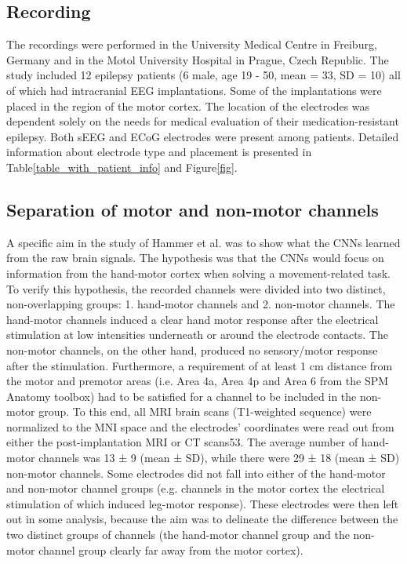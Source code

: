 \subsection{Recording}\label{subsec:recording}
The recordings were performed in the University Medical Centre in Freiburg, Germany and in the Motol University Hospital in Prague, Czech Republic.
The study included 12 epilepsy patients (6 male, age 19 - 50, mean = 33, SD = 10) all of which had intracranial EEG implantations.
Some of the implantations were placed in the region of the motor cortex.
The location of the electrodes was dependent solely on the needs for medical evaluation of their medication-resistant epilepsy.
Both sEEG and ECoG electrodes were present among patients.
Detailed information about electrode type and placement is presented in Table\ref{table_with_patient_info} and Figure\ref{fig}.

\subsection{Separation of motor and non-motor channels}\label{subsec:separation-of-motor-and-non-motor-channels}
A specific aim in the study of Hammer et al.\cite{Hammer-2021} was to show what the CNNs learned from the raw brain signals.
The hypothesis was that the CNNs would focus on information from the hand-motor cortex when solving a movement-related task.
To verify this hypothesis, the recorded channels were divided into two distinct, non-overlapping groups: 1. hand-motor channels and 2. non-motor channels.
The hand-motor channels induced a clear hand motor response after the electrical stimulation at low intensities underneath or around the electrode contacts.
The non-motor channels, on the other hand, produced no sensory/motor response after the stimulation.
Furthermore, a requirement of at least 1 cm distance from the motor and premotor areas (i.e. Area 4a, Area 4p and Area 6 from the SPM Anatomy toolbox\cite{eickhoff-new-2005}) had to be satisfied for a channel to be included in the non-motor group.
To this end, all MRI brain scans (T1-weighted sequence) were normalized to the MNI space and the electrodes' coordinates were read out from either the post-implantation MRI or CT scans53.
The average number of hand-motor channels was 13 ± 9 (mean ± SD), while there were 29 ± 18 (mean ± SD) non-motor channels.
Some electrodes did not fall into either of the hand-motor and non-motor channel groups (e.g. channels in the motor cortex the electrical stimulation of which induced leg-motor response).
These electrodes were then left out in some analysis, because the aim was to delineate the difference between the two distinct groups of channels (the hand-motor channel group and the non-motor channel group clearly far away from the motor cortex).


